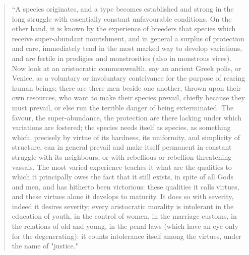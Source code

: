 %
%

\begin{quotation}
``A species originates, and a type becomes established and strong in the long struggle with
essentially constant unfavourable conditions. On the other hand, it is known by the experience of
breeders that species which receive super-abundant nourishment, and in general a surplus of
protection and care, immediately tend in the most marked way to develop variations, and are
fertile in prodigies and monstrosities (also in monstrous vices). Now look at an aristocratic
commonwealth, say an ancient Greek polis, or Venice, as a voluntary or involuntary contrivance
for the purpose of rearing human beings; there are there men beside one another, thrown upon
their own resources, who want to make their species prevail, chiefly because they must prevail,
or else run the terrible danger of being exterminated. The favour, the super-abundance, the
protection are there lacking under which variations are fostered; the species needs itself as
species, as something which, precisely by virtue of its hardness, its uniformity, and simplicity of
structure, can in general prevail and make itself permanent in constant struggle with its
neighbours, or with rebellious or rebellion-threatening vassals. The most varied experience
teaches it what are the qualities to which it principally owes the fact that it still exists, in spite of
all Gods and men, and has hitherto been victorious: these qualities it calls virtues, and these
virtues alone it develops to maturity. It does so with severity, indeed it desires severity; every
aristocratic morality is intolerant in the education of youth, in the control of women, in the
marriage customs, in the relations of old and young, in the penal laws (which have an eye only
for the degenerating): it counts intolerance itself among the virtues, under the name of "justice."

\end{quotation}
